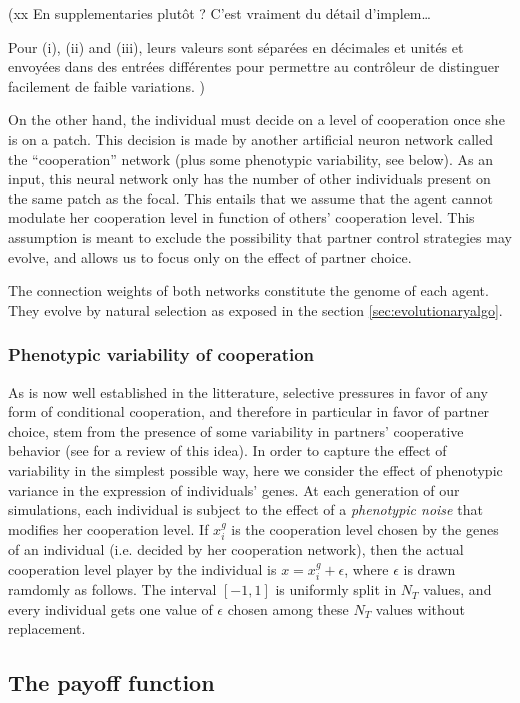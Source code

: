 (xx En supplementaries plutôt ? C'est vraiment du détail d'implem…

Pour (i), (ii) and (iii), leurs valeurs sont séparées en décimales et unités et envoyées dans des entrées différentes pour permettre au contrôleur de distinguer facilement de faible variations.
)

On the other hand, the individual must decide on a level of cooperation once she is on a patch. This decision is made by another artificial neuron network called the ``cooperation'' network (plus some phenotypic variability, see below). As an input, this neural network only has the number of other individuals present on the same patch as the focal. This entails that we assume that the agent cannot modulate her cooperation level in function of others' cooperation level. This assumption is meant to exclude the possibility that partner control strategies may evolve, and allows us to focus only on the effect of partner choice.

The connection weights of both networks constitute the genome of each agent. They evolve by natural selection as exposed in the section \ref{sec:evolutionaryalgo}.


\subsubsection{Phenotypic variability of cooperation}\label{ssec:phenotypic_var}

As is now well established in the litterature, selective pressures in favor of any form of conditional cooperation, and therefore in particular in favor of partner choice, stem from the presence of some variability in partners’ cooperative behavior (see \cite{McNamara2010c} for a review of this idea). In order to capture the effect of variability in the simplest possible way, here we consider the effect of phenotypic variance in the expression of individuals' genes. At each generation of our simulations, each individual is subject to the effect of a \emph{phenotypic noise} that modifies her cooperation level. If $x_i^g$ is the cooperation level chosen by the genes of an individual (i.e. decided by her cooperation network), then the actual cooperation level player by the individual is $x = x_i^g + \epsilon$, where $\epsilon$ is drawn ramdomly as follows. The interval $[-1, 1]$ is uniformly split in $N_T$ values, and every individual gets one value of $\epsilon$ chosen among these $N_T$ values without replacement.


\subsection{The payoff function}

